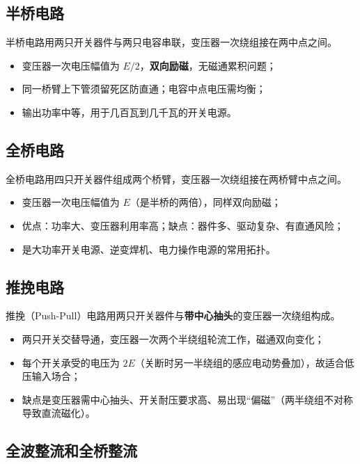 \subsection{半桥电路}

半桥电路用两只开关器件与两只电容串联，变压器一次绕组接在两中点之间。

\begin{itemize}
  \item 变压器一次电压幅值为 $E/2$，\textbf{双向励磁}，无磁通累积问题；
  \item 同一桥臂上下管须留死区防直通；电容中点电压需均衡；
  \item 输出功率中等，用于几百瓦到几千瓦的开关电源。
\end{itemize}

\subsection{全桥电路}

全桥电路用四只开关器件组成两个桥臂，变压器一次绕组接在两桥臂中点之间。

\begin{itemize}
  \item 变压器一次电压幅值为 $E$（是半桥的两倍），同样双向励磁；
  \item 优点：功率大、变压器利用率高；缺点：器件多、驱动复杂、有直通风险；
  \item 是大功率开关电源、逆变焊机、电力操作电源的常用拓扑。
\end{itemize}

\subsection{推挽电路}

推挽（Push-Pull）电路用两只开关器件与\textbf{带中心抽头}的变压器一次绕组构成。

\begin{itemize}
  \item 两只开关交替导通，变压器一次两个半绕组轮流工作，磁通双向变化；
  \item 每个开关承受的电压为 $2E$（关断时另一半绕组的感应电动势叠加），故适合低压输入场合；
  \item 缺点是变压器需中心抽头、开关耐压要求高、易出现“偏磁”（两半绕组不对称导致直流磁化）。
\end{itemize}

\subsection{全波整流和全桥整流}

